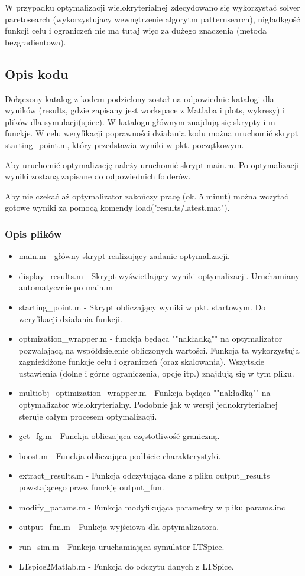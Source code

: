 \documentclass{article}
\begin{document}
W przypadku optymalizacji wielokryterialnej zdecydowano się wykorzystać solver paretosearch (wykorzystujacy wewnętrzenie algorytm patternsearch), nigładkgość funkcji celu i ograniczeń nie ma tutaj więc za dużego znaczenia (metoda bezgradientowa).
\subsection{Opis kodu}
Dołączony katalog z kodem podzielony został na odpowiednie katalogi dla wyników (results, gdzie zapisany jest workspace z Matlaba i plots, wykresy) i plików dla symulacji(spice).
W katalogu głównym znajdują się skrypty i m-funckje. W celu weryfikacji poprawności działania kodu można uruchomić skrypt starting\_point.m, który przedstawia wyniki w pkt. początkowym.

Aby uruchomić optymalizację należy uruchomić skrypt main.m. Po optymalizacji wyniki zostaną zapisane do odpowiednich folderów.

Aby nie czekać aż optymalizator zakończy pracę (ok. 5 minut) można wczytać gotowe wyniki za pomocą komendy load("results/latest.mat").

\subsubsection*{Opis plików}
\begin{itemize}
	\item main.m - główny skrypt realizujący zadanie optymalizacji.
	\item display\_results.m - Skrypt wyświetlający wyniki optymalizacji. Uruchamiany automatycznie po main.m
	\item starting\_point.m - Skrypt obliczający wyniki w pkt. startowym. Do weryfikacji działania funkcji.
	\item optmization\_wrapper.m - funckja będąca ""nakładką"" na optymalizator pozwalającą na współdzielenie
obliczonych wartości. Funkcja ta wykorzystuja zagnieżdżone funkcje celu i ograniczeń (oraz skalowania). Wszytskie ustawienia (dolne i górne ograniczenia, opcje itp.) znajdują się w tym pliku.
	\item multiobj\_optimization\_wrapper.m - Funkcja będąca ""nakładką"" na optymalizator wielokryterialny. Podobnie jak w wersji jednokryterialnej steruje całym procesem optymalizacji.
	\item get\_fg.m - Funckja obliczająca częstotliwość graniczną.
	\item boost.m - Funckja obliczająca podbicie charakterystyki.
	\item extract\_results.m - Funkcja odczytująca dane z pliku output\_results powstającego przez funckję output\_fun.
	\item modify\_params.m - Funkcja modyfikująca parametry w pliku params.inc
	\item output\_fun.m - Funkcja wyjściowa dla optymalizatora.
	\item run\_sim.m - Funkcja uruchamiająca symulator LTSpice.
	\item LTspice2Matlab.m - Funkcja do odczytu danych z LTSpice.
\end{itemize}
\end{document}

